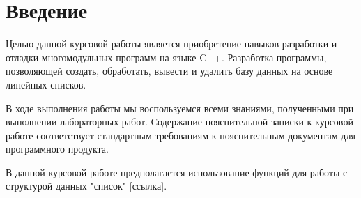 \section{Введение}

Целью данной курсовой работы является приобретение навыков разработки и 
отладки многомодульных программ на языке C++. 
Разработка программы, позволяющей 
создать,
обработать, 
вывести 
и удалить 
базу данных на основе линейных списков.

В ходе выполнения работы мы воспользуемся всеми знаниями, 
полученными при выполнении лабораторных работ.
Содержание пояснительной записки к курсовой работе 
соответствует стандартным требованиям к пояснительным 
документам для программного продукта.

В данной курсовой работе предполагается использование функций для
работы с структурой данных "список" [ссылка]. 
